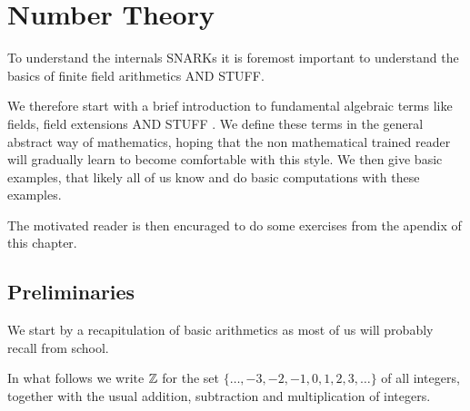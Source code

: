 \chapter{Number Theory}

To understand the internals SNARKs it is foremost important to understand the basics of finite field arithmetics AND STUFF.

We therefore start with a brief introduction to fundamental algebraic terms like fields, field extensions AND STUFF . We define these terms in the general abstract way of mathematics, hoping that the non mathematical trained reader will gradually learn to become comfortable with this style. We then give basic examples, that likely all of us know and do basic computations with these examples. 

The motivated reader is then encuraged to do some exercises from  the apendix of this chapter.

\section{Preliminaries}
We start by a recapitulation of basic arithmetics as most of us will probably recall from school.

In what follows we write $\mathbb{Z}$ for the set $\{\ldots, -3,-2,-1,0,1,2,3,\ldots\}$ of all integers, together with the usual addition, subtraction and multiplication of integers.

